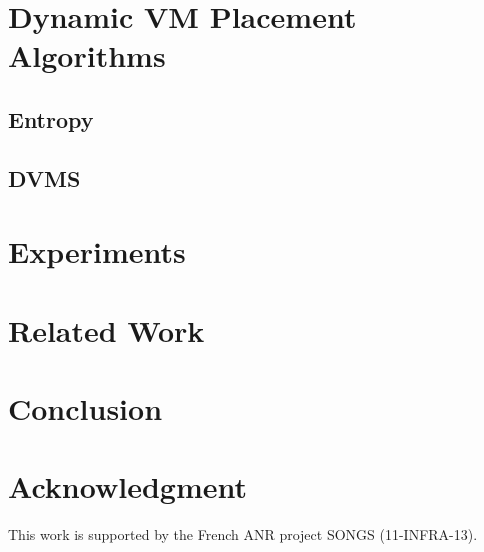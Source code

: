 \documentclass[conference]{IEEEtran}
\begin{document}
\section{Dynamic VM Placement Algorithms}
\label{sec:vm-schedulers}
\subsection{Entropy}
\label{subsec:entropy}



\subsection{DVMS}
\label{subsec:dvms}

\section{Experiments}
\label{sec:experiments}
\section{Related Work}
\label{sec:related}
\section{Conclusion}
\label{sec:conclusion}





\section*{Acknowledgment}
This work is supported by the French ANR project SONGS (11-INFRA-13).




\end{document}
